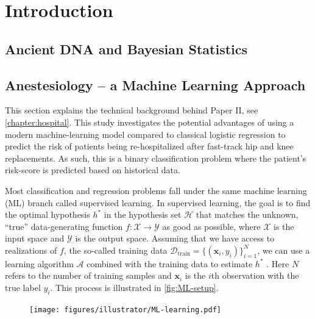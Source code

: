 
\chapter{Introduction}



\section{Ancient DNA and Bayesian Statistics}
\label{section:ancientDNA}



\section{Anestesiology -- a Machine Learning Approach }
\label{section:machine-learning}

This section explains the technical background behind Paper II, see \autoref{chapter:hospital}. This study investigates the potential advantages of using a modern machine-learning model compared to classical logistic regression to predict the risk of patients being re-hospitalized after fast-track hip and knee replacements. As such, this is a binary classification problem where the patient's risk-score is predicted based on historical data.

Most classification and regression problems fall under the same machine learning (ML) branch called supervised learning. In supervised learning, the goal is to find the optimal hypothesis $h^*$ in the hypothesis set $\mathcal{H}$ that matches the unknown, ``true'' data-generating function $f: \mathcal{X} \rightarrow \mathcal{Y}$ as good as possible, where $\mathcal{X}$ is the input space and $\mathcal{Y}$ is the output space. Assuming that we have access to realizations of $f$, the so-called training data $\mathcal{D}_\mathrm{train} = \{(\mathbf{x}_i, y_i)\}_{i=1}^N$, we can use a learning algorithm $\mathcal{A}$ combined with the training data to estimate $h^*$ \autocite{abu-mostafaLearningData2012a}. Here $N$ refers to the number of training samples and $\mathbf{x}_i$ is the $i$th observation with the true label $y_i$. This process is illustrated in \autoref{fig:ML-setup}.

\begin{figure}[htbp]
    \centering
    \texttt{[image: figures/illustrator/ML-learning.pdf]}
\end{figure}

